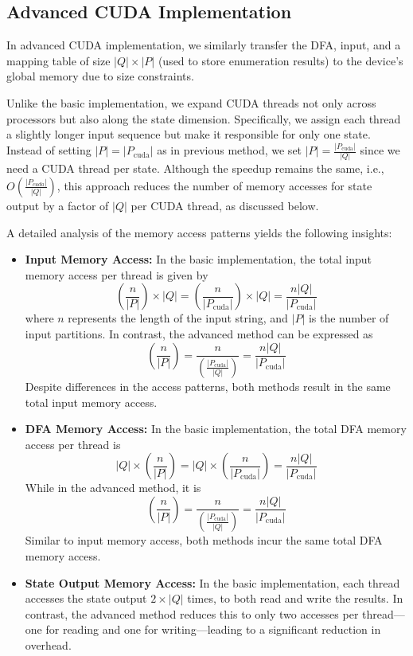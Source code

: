 \documentclass[sigconf]{acmart}
\begin{document}
\subsection{Advanced CUDA Implementation}
In advanced CUDA implementation, we similarly transfer the DFA, input, and a mapping table of size $|Q| \times |P|$ (used to store enumeration results) to the device's global memory due to size constraints.

Unlike the basic implementation, we expand CUDA threads not only across processors but also along the state dimension. Specifically, we assign each thread a slightly longer input sequence but make it responsible for only one state. Instead of setting $|P| = |P_{\text{cuda}}|$ as in previous method, we set $|P| = \frac{|P_{\text{cuda}}|}{|Q|}$ since we need a CUDA thread per state. Although the speedup remains the same, i.e.,$O\left(\frac{|P_{cuda}|}{|Q|}\right)$, this approach reduces the number of memory accesses for state output by a factor of $|Q|$ per CUDA thread, as discussed below.

A detailed analysis of the memory access patterns yields the following insights:

\begin{itemize}
	\item \textbf{Input Memory Access:} In the basic implementation, the total input memory access per thread is given by
	      \[
		      \left(\frac{n}{|P|}\right) \times |Q| = \left(\frac{n}{|P_{\text{cuda}}|}\right) \times |Q| = \frac{n|Q|}{|P_{\text{cuda}}|}
	      \]
	      where $n$ represents the length of the input string, and $|P|$ is the number of input partitions. In contrast, the advanced method can be expressed as
	      \[
		      \left(\frac{n}{|P|}\right) = \frac{n}{\left(\frac{|P_{\text{cuda}}|}{|Q|}\right)} = \frac{n|Q|}{|P_{\text{cuda}}|}
	      \]
	      Despite differences in the access patterns, both methods result in the same total input memory access.

	\item \textbf{DFA Memory Access:} In the basic implementation, the total DFA memory access per thread is
	      \[
		      |Q| \times \left(\frac{n}{|P|}\right) = |Q| \times \left(\frac{n}{|P_{\text{cuda}}|}\right) = \frac{n|Q|}{|P_{\text{cuda}}|}
	      \]
	      While in the advanced method, it is
	      \[
		      \left(\frac{n}{|P|}\right) = \frac{n}{\left(\frac{|P_{\text{cuda}}|}{|Q|}\right)} = \frac{n|Q|}{|P_{\text{cuda}}|}
	      \]
	      Similar to input memory access, both methods incur the same total DFA memory access.

	\item \textbf{State Output Memory Access:} In the basic implementation, each thread accesses the state output $2 \times |Q|$ times, to both read and write the results. In contrast, the advanced method reduces this to only two accesses per thread—one for reading and one for writing—leading to a significant reduction in overhead.
\end{itemize}
\end{document}
